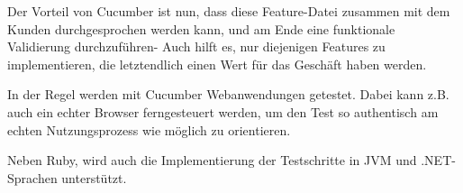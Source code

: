 Der Vorteil von Cucumber ist nun, dass diese Feature-Datei zusammen mit dem Kunden durchgesprochen werden kann, und am Ende eine funktionale Validierung durchzuführen- Auch hilft es, nur diejenigen Features zu implementieren, die letztendlich einen Wert für das Geschäft haben werden. 
 
In der Regel werden mit Cucumber Webanwendungen getestet. Dabei kann z.B. auch ein echter Browser ferngesteuert werden, um den Test so authentisch am echten Nutzungsprozess wie möglich zu orientieren. 

Neben Ruby, wird auch die Implementierung der Testschritte in JVM und .NET-Sprachen unterstützt.
